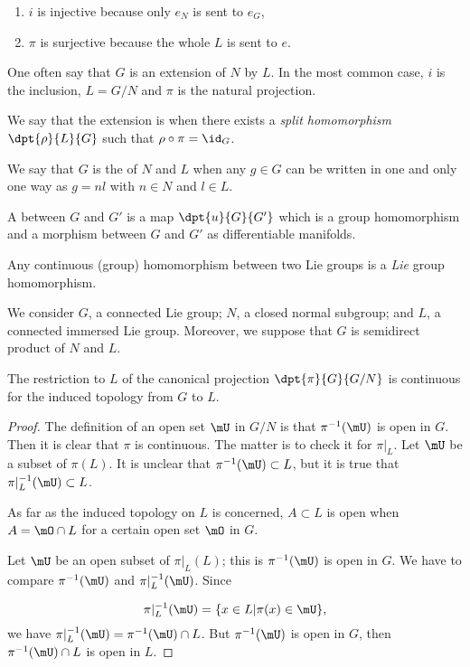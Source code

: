 \begin{enumerate}
\item $i$ is injective because only $e_N$ is sent to $e_G$,
\item $\pi$ is surjective because the whole $L$ is sent to $e$.
\end{enumerate}
One often say that $G$ is an extension of $N$ by $L$. In the most common case, $i$ is the inclusion, $L=G/N$ and $\pi$ is the natural projection.

We say that the extension is  when there exists a \emph{split homomorphism} $\dpt{\rho}{L}{G}$ such that $\rho\circ\pi=\id_G$.

\begin{definition}
We say that $G$ is the  of $N$ and $L$ when any $g\in G$ can be written in one and only one way as $g=nl$ with $n\in N$ and $l\in L$.
\end{definition}


\begin{definition}
A  between $G$ and $G'$ is a map $\dpt{u}{G}{G'}$ which is a group homomorphism and a morphism between $G$ and $G'$ as differentiable manifolds.
\end{definition}

\begin{lemma}
Any continuous (group) homomorphism between two Lie groups is a \emph{Lie} group homomorphism.
\end{lemma}

We consider $G$, a connected Lie group; $N$, a closed normal subgroup; and $L$, a connected immersed Lie group. Moreover, we suppose that $G$ is semidirect product of $N$ and $L$.

\begin{proposition}
The restriction to $L$ of the canonical projection $\dpt{\pi}{G}{G/N}$ is continuous for the induced topology from $G$ to $L$.
\end{proposition}
\begin{proof}
      The definition of an open set $\mU$ in $G/N$ is that $\pi^{-1}(\mU)$ is open in $G$. Then it is clear that $\pi$ is continuous. The matter is to check it for $\pi|_L$. Let $\mU$ be a subset of $\pi(L)$. It is unclear that $\pi^{-1}(\mU)\subset L$, but it is true that $\pi|_L^{-1}(\mU)\subset L$.

      As far as the induced topology on $L$ is concerned, $A\subset L$ is open when $A=\mO\cap L$ for a certain open set $\mO$ in $G$.

      Let $\mU$ be an open subset of $\pi|_L(L)$; this is $\pi^{-1}(\mU)$ is open in $G$. We have to compare $\pi^{-1}(\mU)$ and $\pi|_L^{-1}(\mU)$. Since

    \[
        \pi|_L^{-1}(\mU)=\{x\in L|\pi(x)\in\mU\},
    \]
    we have $\pi|_L^{-1}(\mU)=\pi^{-1}(\mU)\cap L$. But $\pi^{-1}(\mU)$ is open in $G$, then $\pi^{-1}(\mU)\cap L$ is open in $L$.
\end{proof}

